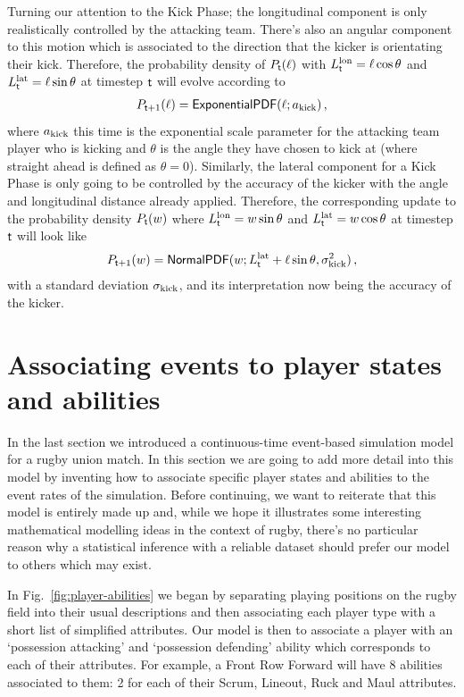 Turning our attention to the {\sf Kick Phase}; the longitudinal component is only realistically controlled by the attacking team. There's also an angular component to this motion which is associated to the direction that the kicker is orientating their kick. Therefore, the probability density of $P_{{\sf t}}(\ell )$ with $L^{\rm lon}_{{\sf t}}=\ell \cos \theta$ and $L^{\rm lat}_{{\sf t}}=\ell \sin \theta$ at timestep ${\sf t}$ will evolve according to
\begin{align}
P_{{\sf t}+1}(\ell ) = {\sf ExponentialPDF}(\ell; a_{\rm kick}) \label{eq:longitudinal-motion-rugby-kicking} \,,
\end{align}
where $a_{\rm kick}$ this time is the exponential scale parameter for the attacking team player who is kicking and $\theta$ is the angle they have chosen to kick at (where straight ahead is defined as $\theta = 0$). Similarly, the lateral component for a {\sf Kick Phase} is only going to be controlled by the accuracy of the kicker with the angle and longitudinal distance already applied. Therefore, the corresponding update to the probability density $P_{{\sf t}}(w)$ where $L^{\rm lon}_{{\sf t}}=w \sin \theta$ and $L^{\rm lat}_{{\sf t}}=w \cos \theta$ at timestep ${\sf t}$ will look like
\begin{align}
P_{{\sf t}+1}(w) = {\sf NormalPDF}(w; L^{\rm lat}_{{\sf t}} + \ell \sin \theta, \sigma_{\rm kick}^2) \label{eq:lateral-motion-rugby-kicking} \,,
\end{align}
with a standard deviation $\sigma_{\rm kick}$, and its interpretation now being the accuracy of the kicker.

\section{\sffamily Associating events to player states and abilities}

In the last section we introduced a continuous-time event-based simulation model for a rugby union match. In this section we are going to add more detail into this model by inventing how to associate specific player states and abilities to the event rates of the simulation. Before continuing, we want to reiterate that this model is entirely made up and, while we hope it illustrates some interesting mathematical modelling ideas in the context of rugby, there's no particular reason why a statistical inference with a reliable dataset should prefer our model to others which may exist.

In Fig.~\ref{fig:player-abilities} we began by separating playing positions on the rugby field into their usual descriptions and then associating each player type with a short list of simplified attributes. Our model is then to associate a player with an `possession attacking' and `possession defending' ability which corresponds to each of their attributes. For example, a Front Row Forward will have 8 abilities associated to them: 2 for each of their {\sf Scrum}, {\sf Lineout}, {\sf Ruck} and {\sf Maul} attributes.

